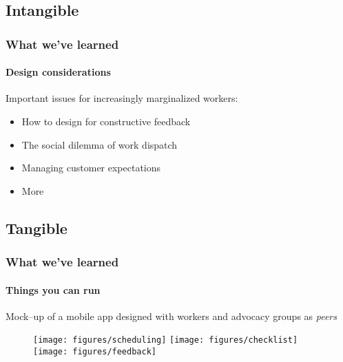 \documentclass{beamer}
\begin{document}
\subsection[]{Intangible}
\begin{frame}
  \frametitle{What we've learned}
  \framesubtitle{Design considerations}
  Important issues for increasingly marginalized workers:
  \begin{itemize}
    \item
    How to design for constructive feedback
    \item
    The social dilemma of work dispatch
    \item
    Managing customer expectations
    \item
    More
  \end{itemize}

\end{frame}



\subsection[]{Tangible}
\begin{frame}
  \frametitle{What we've learned}
  \framesubtitle{Things you can run}
  Mock--up of a mobile app designed with workers and advocacy groups as \textit{peers}
  \begin{figure}
    \texttt{[image: figures/scheduling]}
    \texttt{[image: figures/checklist]}
    \texttt{[image: figures/feedback]}
  \end{figure}

\end{frame}
\end{document}
